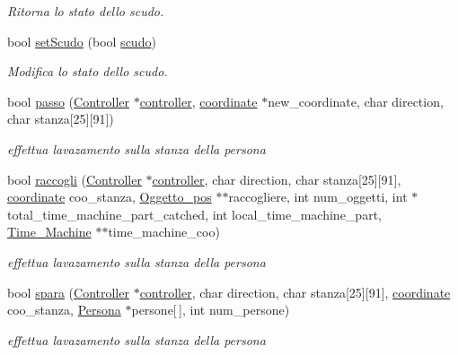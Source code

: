 \begin{DoxyCompactItemize}
\begin{DoxyCompactList}\small\item\em Ritorna lo stato dello scudo. \end{DoxyCompactList}\item 
bool \hyperlink{classIA__Persona_a71520669c85eea90e2fd1dac2a7372d0}{set\+Scudo} (bool \hyperlink{classPersona_a1af99e040deeb7015e7e99bb2a5128f4}{scudo})
\begin{DoxyCompactList}\small\item\em Modifica lo stato dello scudo. \end{DoxyCompactList}\item 
bool \hyperlink{classIA__Persona_aad9235e41742654f77ea0abc771e51c4}{passo} (\hyperlink{structController}{Controller} $\ast$\hyperlink{structcontroller}{controller}, \hyperlink{structcoordinate}{coordinate} $\ast$new\+\_\+coordinate, char direction, char stanza\mbox{[}25\mbox{]}\mbox{[}91\mbox{]})
\begin{DoxyCompactList}\small\item\em effettua l\textquotesingle{}avazamento sulla stanza della persona \end{DoxyCompactList}\item 
bool \hyperlink{classIA__Persona_ad8ad21a6a106d3d98e18d1c33f906f87}{raccogli} (\hyperlink{structController}{Controller} $\ast$\hyperlink{structcontroller}{controller}, char direction, char stanza\mbox{[}25\mbox{]}\mbox{[}91\mbox{]}, \hyperlink{structcoordinate}{coordinate} coo\+\_\+stanza, \hyperlink{structOggetto__pos}{Oggetto\+\_\+pos} $\ast$$\ast$raccogliere, int num\+\_\+oggetti, int $\ast$total\+\_\+time\+\_\+machine\+\_\+part\+\_\+catched, int local\+\_\+time\+\_\+machine\+\_\+part, \hyperlink{structTime__Machine}{Time\+\_\+\+Machine} $\ast$$\ast$time\+\_\+machine\+\_\+coo)
\begin{DoxyCompactList}\small\item\em effettua l\textquotesingle{}avazamento sulla stanza della persona \end{DoxyCompactList}\item 
bool \hyperlink{classIA__Persona_abd04c4e981f7e1260784c1d7f7a3614f}{spara} (\hyperlink{structController}{Controller} $\ast$\hyperlink{structcontroller}{controller}, char direction, char stanza\mbox{[}25\mbox{]}\mbox{[}91\mbox{]}, \hyperlink{structcoordinate}{coordinate} coo\+\_\+stanza, \hyperlink{classPersona}{Persona} $\ast$persone\mbox{[}$\,$\mbox{]}, int num\+\_\+persone)
\begin{DoxyCompactList}\small\item\em effettua l\textquotesingle{}avazamento sulla stanza della persona \end{DoxyCompactList}\item 

\end{DoxyCompactItemize}
